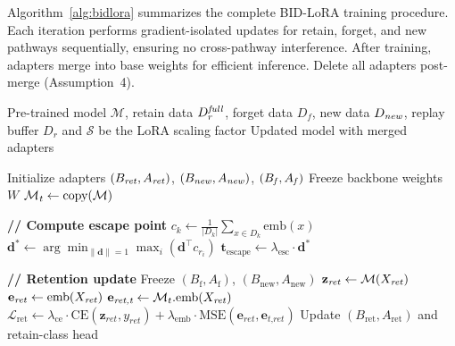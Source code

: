 \label{4.4}
Algorithm~\ref{alg:bidlora} summarizes the complete BID-LoRA training procedure. Each iteration performs gradient-isolated updates for retain, forget, and new pathways sequentially, ensuring no cross-pathway interference. After training, adapters merge into base weights for efficient inference. Delete all adapters post-merge (Assumption~4).
\begin{algorithm}[!htbp]
\caption{BID-LoRA Training}
\label{alg:bidlora} 
\begin{algorithmic}[1]
\Require Pre-trained model $\mathcal{M}$, retain data $D^\text{\textit{full}}_r$, forget data $D_f$, new data $D_\text{\textit{new}}$, replay buffer $D_r$ 
and $\mathcal{S}$ be the LoRA scaling factor
\Ensure Updated model with merged adapters

\State Initialize adapters $(B_{\text{\textit{ret}}}, A_{\text{\textit{ret}}})$, $(B_{\text{\textit{new}}}, A_{\text{\textit{new}}})$, $(B_{\text{\textit{f}}}, A_{\text{\textit{f}}})$
\State Freeze backbone weights $W$
\State $\mathcal{M_\text{\textit{t}}} \gets \text{copy}(\mathcal{M})$ 

\State \textbf{// Compute escape point}
    \State $c_k \gets \frac{1}{|D_k|}\sum_{x \in D_k} \text{emb}(x)$ 
\EndFor
\State $\mathbf{d}^* \gets \arg\min_{\|\mathbf{d}\|=1} \max_{i} (\mathbf{d}^\top c_{r_i})$ 
\State $\mathbf{t}_{\text{escape}} \gets \lambda_{\text{esc}} \cdot \mathbf{d}^*$ 

        \State \textbf{// Retention update}
        \State Freeze $(B_{\text{f}}, A_{\text{f}})$, $(B_{\text{new}}, A_{\text{new}})$
        \State $\mathbf{z}_\text{\textit{ret}} \gets \mathcal{M}(X_\text{\textit{ret}})$ 
        \State $\mathbf{e}_\text{\textit{ret}} \gets \text{emb}(X_\text{\textit{ret}})$ 
        \State $\mathbf{e}_\textit{ret,t} \gets \mathcal{M}_t.\text{emb}(X_\text{\textit{ret}})$ 
        \State $\mathcal{L}_{\text{ret}} \gets \lambda_{\text{ce}} \cdot \text{CE}(\mathbf{z}_\textit{ret}, y_\textit{ret}) + \lambda_{\text{emb}} \cdot \text{MSE}(\mathbf{e}_\textit{ret}, \mathbf{e}_\textit{t,ret})$
        \State Update $(B_{\text{ret}}, A_{\text{ret}})$ and retain-class head
        

\end{algorithmic}
\end{algorithm}
